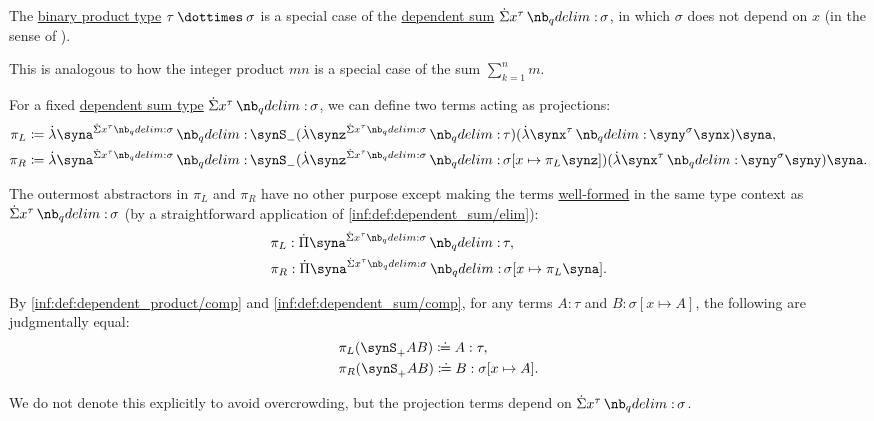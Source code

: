 \begin{remark}\label{rem:dependent_sum_as_binary_product}
  The \hyperref[def:simple_product_type]{binary product type} \( \tau \syntimes \sigma \) is a special case of the \hyperref[def:dependent_product]{dependent sum} \( \qsum {x^\tau} \sigma \), in which \( \sigma \) does not depend on \( x \) (in the sense of ).

  This is analogous to how the integer product \( mn \) is a special case of the sum \( \sum_{k=1}^n m \).
\end{remark}

\begin{definition}\label{def:dependent_sum_projections}\mimprovised
  For a fixed \hyperref[def:dependent_sum]{dependent sum type} \( \qsum {x^\tau} \sigma \), we can define two terms acting as projections:
  \begin{align*}
    \pi_L &\coloneqq \qabs {\syna^{\qsum {x^\tau} \sigma}} \synS_- (\qabs {\synz^{\qsum {x^\tau} \sigma}} \tau) (\qabs {\synx^\tau} {\syny^\sigma} \synx) \syna, \\
    \pi_R &\coloneqq \qabs {\syna^{\qsum {x^\tau} \sigma}} \synS_- (\qabs {\synz^{\qsum {x^\tau} \sigma}} \sigma[x \mapsto \pi_L \synz]) (\qabs {\synx^\tau} {\syny^\sigma} \syny) \syna.
  \end{align*}

  The outermost abstractors in \( \pi_L \) and \( \pi_R \) have no other purpose except making the terms \hyperref[def:mltt_well_formed_context/type]{well-formed} in the same type context as \( \qsum {x^\tau} \sigma \) (by a straightforward application of \ref{inf:def:dependent_sum/elim}):
  \begin{align*}
    &\pi_L: \qprod {\syna^{\qsum {x^\tau} \sigma}} \tau, \\
    &\pi_R: \qprod {\syna^{\qsum {x^\tau} \sigma}} \sigma[x \mapsto \pi_L \syna].
  \end{align*}

  By \ref{inf:def:dependent_product/comp} and \ref{inf:def:dependent_sum/comp}, for any terms \( A: \tau \) and \( B: \sigma[x \mapsto A] \), the following are judgmentally equal:
  \begin{align*}
    &\pi_L (\synS_+ A B) \syndefeq A: \tau, \\
    &\pi_R (\synS_+ A B) \syndefeq B: \sigma[x \mapsto A].
  \end{align*}
\end{definition}
\begin{comments}
  \item We do not denote this explicitly to avoid overcrowding, but the projection terms depend on \( \qsum {x^\tau} \sigma \).
\end{comments}

